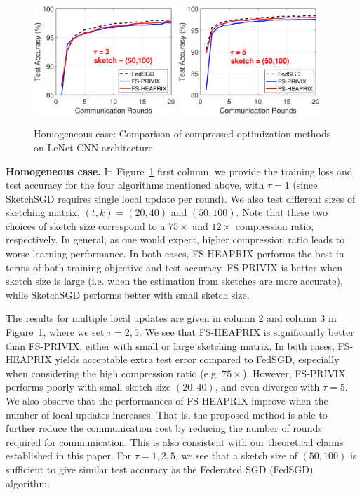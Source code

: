 \documentclass[twoside]{article}
\begin{document}
\begin{figure}[H]
\begin{center}
{		\includegraphics[width=2.1in]{MNIST_figures/local2_sketch50_iid1_test_acc.eps} \hspace{-0.2in}
		\includegraphics[width=2.1in]{MNIST_figures/local5_sketch50_iid1_test_acc.eps}
		}
	\end{center}
	\caption{Homogeneous case: Comparison of compressed optimization methods on LeNet CNN architecture.}
    \label{fig:MNIST-iid1}
\end{figure}

\textbf{Homogeneous case.} In Figure~\ref{fig:MNIST-iid1} first column, we provide the training loss and test accuracy for the four algorithms mentioned above, with $\tau=1$ (since SketchSGD requires single local update per round). 
We also test different sizes of sketching matrix, $(t,k)=(20,40)$ and $(50,100)$. Note that these two choices of sketch size correspond to a $75\times$ and $12\times$ compression ratio, respectively. 
In general, as one would expect, higher compression ratio leads to worse learning performance. In both cases, FS-HEAPRIX performs the best in terms of both training objective and test accuracy. FS-PRIVIX is better when sketch size is large (i.e. when the estimation from sketches are more accurate), while SketchSGD performs better with small sketch size. 

The results for multiple local updates are given in column 2 and column 3 in Figure~\ref{fig:MNIST-iid1}, where we set $\tau=2,5$. We see that FS-HEAPRIX is significantly better than FS-PRIVIX, either with small or large sketching matrix. In both cases, FS-HEAPRIX yields acceptable extra test error compared to FedSGD, especially when considering the high compression ratio (e.g. $75\times$). However, FS-PRIVIX performs poorly with small sketch size $(20,40)$, and even diverges with $\tau=5$. 
We also observe that the performances of FS-HEAPRIX improve when the number of local updates increases. That is, the proposed method is able to further reduce the communication cost by reducing the number of rounds required for communication. This is also consistent with our theoretical claims established in this paper. For $\tau=1,2,5$, we see that a sketch size of $(50,100)$ is sufficient to give similar test accuracy as the Federated SGD (FedSGD) algorithm.
\end{document}
